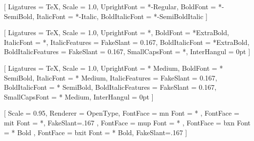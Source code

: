 \usepackage{diagbox}                        %
\usepackage[utf8]{inputenc}
\usepackage{setspace}
\usepackage{tocloft}
\usepackage{makeidx}                        %
\usepackage{parskip}
\usepackage[hangul]{xetexko}
\usepackage[T1]{fontenc} 
\usepackage{listings}                       %
\usepackage[framemethod=tikz]{mdframed}
\usepackage[unicode]{hyperref}
\usepackage{multirow}
\usepackage[many]{tcolorbox}
\usepackage{makecell}
\usepackage{environ}
\usepackage[tikz]{bclogo}
\usepackage{tikz}
\usepackage{natbib}
\usepackage{lastpage}
\usepackage{graphicx}
\usepackage{awesomebox}                     %


\setmainfont{Lora}[%
  Ligatures = TeX,
  Scale     = 1.0,
  UprightFont = *-Regular,
  BoldFont = *-SemiBold,
  ItalicFont = *-Italic,
  BoldItalicFont = *-SemiBoldItalic
]


[%
  Ligatures = TeX,
  Scale     = 1.0,
  UprightFont = *,
  BoldFont = *ExtraBold,
  ItalicFont = *,
  ItalicFeatures = {FakeSlant = 0.167},
  BoldItalicFont = *ExtraBold,
  BoldItalicFeatures = {FakeSlant = 0.167},
  SmallCapsFont = *,
  InterHangul = 0pt
]

[%
  Ligatures = TeX,
  Scale     = 1.0,
  UprightFont = * Medium,
  BoldFont = * SemiBold,
  ItalicFont = * Medium,
  ItalicFeatures = {FakeSlant = 0.167},
  BoldItalicFont = * SemiBold,
  BoldItalicFeatures = {FakeSlant = 0.167},
  SmallCapsFont = * Medium,
  InterHangul = 0pt
]


\setmonofont{D2Coding}[%
  Scale = 0.95,
  Renderer = OpenType,
	FontFace = {m}{n}{ Font = * },
	FontFace = {m}{it}{ Font = *, FakeSlant=.167 },
	FontFace = {m}{up}{ Font = * },
	FontFace = {bx}{n}{ Font = {* Bold} },
	FontFace = {bx}{it}{ Font = {* Bold}, FakeSlant=.167 }
]

